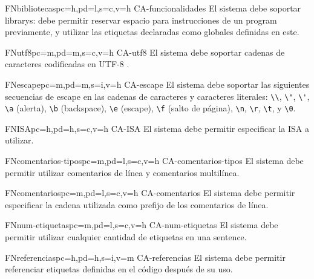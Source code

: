 \begin{softwareReq}{FN}{bibliotecas}{pc=h,pd=l,s=c,v=h}
    {CA-funcionalidades}
    El sistema debe soportar \glspl{library}: debe permitir reservar espacio para
    instrucciones de un \gls{program} 
    previamente, y utilizar las etiquetas declaradas como globales definidas en
    este.
\end{softwareReq}

\begin{softwareReq}{FN}{utf8}{pc=m,pd=m,s=c,v=h}
    {CA-utf8}
    El sistema debe soportar cadenas de caracteres codificadas en UTF-8 \parencite{UTF-8}.
\end{softwareReq}

\begin{softwareReq}{FN}{escape}{pc=m,pd=m,s=i,v=h}
    {CA-escape}
    El sistema debe soportar las siguientes secuencias de escape en las cadenas
    de caracteres y caracteres literales: \verb!\\!, \verb!\"!, \verb!\'!,
    \verb!\a! (alerta), \verb!\b! (backspace), \verb!\e! (escape), \verb!\f!
    (salto de página), \verb!\n!, \verb!\r!, \verb!\t!, y \verb!\0!.
\end{softwareReq}

\begin{softwareReq}{FN}{ISA}{pc=h,pd=h,s=c,v=h}
    {CA-ISA}
    El sistema debe permitir especificar la \gls{ISA} a utilizar.
\end{softwareReq}

\begin{softwareReq}{FN}{comentarios-tipos}{pc=m,pd=l,s=c,v=h}
    {CA-comentarios-tipos}
    El sistema debe permitir utilizar comentarios de línea y comentarios
    multilínea.
\end{softwareReq}

\begin{softwareReq}{FN}{comentarios}{pc=m,pd=l,s=c,v=h}
    {CA-comentarios}
    El sistema debe permitir especificar la cadena utilizada como prefijo de los
    comentarios de línea.
\end{softwareReq}

\begin{softwareReq}{FN}{num-etiquetas}{pc=m,pd=l,s=c,v=h}
    {CA-num-etiquetas}
    El sistema debe permitir utilizar cualquier cantidad de etiquetas en una
    \gls{sentence}.
\end{softwareReq}

\begin{softwareReq}{FN}{referencias}{pc=h,pd=h,s=i,v=m}
    {CA-referencias}
    El sistema debe permitir referenciar etiquetas definidas en el
    código  después de su uso.
\end{softwareReq}

